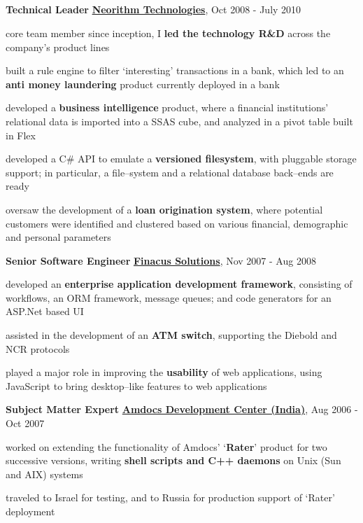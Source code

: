 \documentclass[a4paper,11pt,final]{article}
\newcommand{\resumetitle}[1]{%
  \subsection*{%
    \large\sc{#1}%
    \normalsize
  }%
  
}%
\newcommand{\jobexp}[5]{%
	\textbf{{#4}}
	\hfill
	\textbf{\href{#2}{#1}}, {#3}
	\\\vspace{-12pt}%
}
\newcommand{\resumedescheader}[1]{%
  \smallskip%
  \resumetitle{#1}
}%
\begin{document}
\resumedescheader{Career}
\jobexp
	{Neorithm Technologies}
	{http://www.neorithm.com}
	{Oct 2008 - July 2010}
	{Technical Leader}
	{Core team member since inception, led the technology R\&D across the company's product lines}
\begin{itemize*}
\item core team member since inception, I \textbf{led the technology R\&D} across the company's product lines
\item built a rule engine to filter `interesting' transactions in a bank, which led to an \textbf{anti money laundering} product currently deployed in a bank
\item developed a \textbf{business intelligence} product, where a financial institutions' relational data is imported into a SSAS cube, and analyzed in a pivot table built in Flex
\item developed a C\# API to emulate a \textbf{versioned filesystem}, with pluggable storage support; in particular, a file--system and a relational database back--ends are ready
\item oversaw the development of a \textbf{loan origination system}, where potential customers were identified and clustered based on various financial, demographic and personal parameters
\end{itemize*}
\vspace{5pt}
\jobexp
	{Finacus Solutions}
	{http://www.finacus.com}
	{Nov 2007 - Aug 2008}
	{Senior Software Engineer}
	{Core team member, enabled rapid application development with an in-house framework}
\begin{itemize*}
\item developed an \textbf{enterprise application development framework}, consisting of workflows, an ORM framework, message queues; and code generators for an ASP.Net based UI
\item assisted in the development of an \textbf{ATM switch}, supporting the Diebold and NCR protocols
\item played a major role in improving the \textbf{usability} of web applications, using JavaScript to bring desktop--like features to web applications
\end{itemize*}
\vspace{5pt}
\jobexp
	{Amdocs Development Center (India)}
	{http://www.amdocs.com}
	{Aug 2006 - Oct 2007}
	{Subject Matter Expert}
	{Implemented Amdocs' telecom billing functionality using Unix processes}
\begin{itemize*}
\item worked on extending the functionality of Amdocs' `\textbf{Rater}' product for two successive versions, writing \textbf{shell scripts and C++ daemons} on Unix (Sun and AIX) systems
\item traveled to Israel for testing, and to Russia for production support of `Rater' deployment
\end{itemize*}
\end{document}
